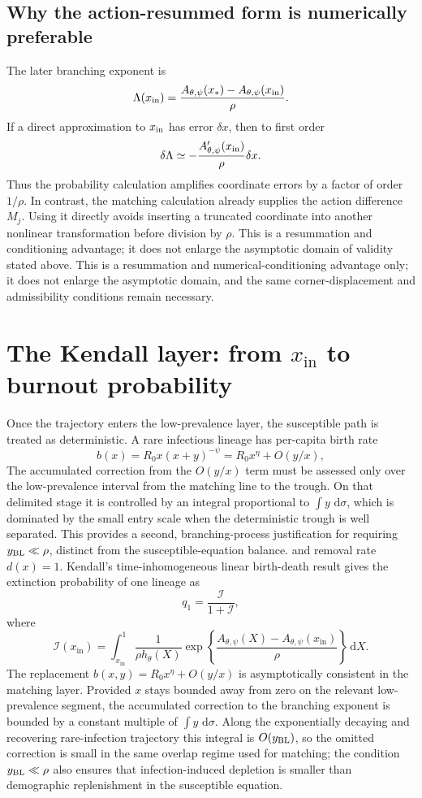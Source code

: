 \documentclass[11pt]{article}
\newcommand{\Rzero}{R_0}
\newcommand{\hth}{h_\theta}
\newcommand{\Apsi}{A_{\theta,\psi}}
\newcommand{\xin}{x_{\mathrm{in}}}
\newcommand{\dd}{\,\mathrm{d}}
\begin{document}
\subsection{Why the action-resummed form is numerically preferable}
The later branching exponent is
\[
\Lambda(x_{\rm in})
=\frac{A_{\theta,\psi}(x_*)-A_{\theta,\psi}(x_{\rm in})}{\rho}.
\]
If a direct approximation to \(x_{\rm in}\) has error \(\delta x\), then to first order
\[
\delta\Lambda\simeq-\frac{A_{\theta,\psi}'(x_{\rm in})}{\rho}\delta x.
\]
Thus the probability calculation amplifies coordinate errors by a factor of order \(1/\rho\). In contrast, the matching calculation already supplies the action difference \(M_j\). Using it directly avoids inserting a truncated coordinate into another nonlinear transformation before division by \(\rho\).  This is a resummation and conditioning advantage; it does not enlarge the asymptotic domain of validity stated above.
This is a resummation and numerical-conditioning advantage only; it does not enlarge the asymptotic domain, and the same corner-displacement and admissibility conditions remain necessary.

\section{The Kendall layer: from \texorpdfstring{\(\xin\)}{xin} to burnout probability}
Once the trajectory enters the low-prevalence layer, the susceptible path is treated as deterministic. A rare infectious lineage has per-capita birth rate
\[
b(x)=\Rzero x(x+y)^{-\psi}=\Rzero x^\eta+O(y/x),
\]
The accumulated correction from the \(O(y/x)\) term must be assessed only over the low-prevalence interval from the matching line to the trough.  On that delimited stage it is controlled by an integral proportional to \(\int y\,\dd\sigma\), which is dominated by the small entry scale when the deterministic trough is well separated.  This provides a second, branching-process justification for requiring \(y_{\rm BL}\ll\rho\), distinct from the susceptible-equation balance.
and removal rate \(d(x)=1\). Kendall's time-inhomogeneous linear birth-death result gives the extinction probability of one lineage as
\[
q_1=\frac{\mathcal I}{1+\mathcal I},
\]
where
\[
\mathcal I(\xin)
=\int_{\xin}^{1}
\frac{1}{\rho\hth(X)}
\exp\left\{
\frac{\Apsi(X)-\Apsi(\xin)}{\rho}
\right\}\dd X.
\]
The replacement \(b(x,y)=R_0x^\eta+O(y/x)\) is asymptotically consistent in the matching layer. Provided \(x\) stays bounded away from zero on the relevant low-prevalence segment, the accumulated correction to the branching exponent is bounded by a constant multiple of \(\int y\,\dd\sigma\). Along the exponentially decaying and recovering rare-infection trajectory this integral is \(O(y_{\rm BL})\), so the omitted correction is small in the same overlap regime used for matching; the condition \(y_{\rm BL}\ll\rho\) also ensures that infection-induced depletion is smaller than demographic replenishment in the susceptible equation.
\end{document}
